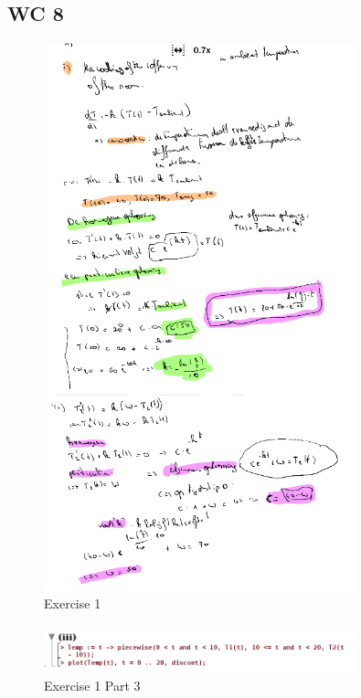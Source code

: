 \documentclass[a4paper]{report}
\begin{document}


\subsection*{WC 8}

\begin{figure}[H]
	\centering
	\includegraphics[width=0.8\textwidth]{assets/wc_8_ex_1.png}
	\caption{Exercise 1}
	\label{fig:wc_8_ex_1}
\end{figure}

\begin{figure}[H]
	\centering
	\includegraphics[width=0.8\textwidth]{assets/wc_8_ex_1_part_3.png}
	\caption{Exercise 1 Part 3}
	\label{fig:wc_8_ex_1_part_3}
\end{figure}
\end{document}
